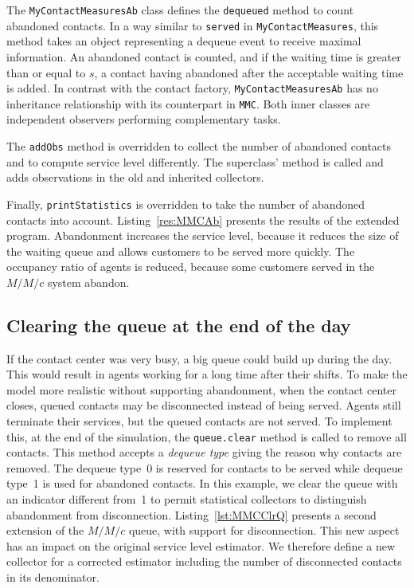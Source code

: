 

The
\texttt{My\-Contact\-Measures\-Ab} class defines the \texttt{dequeued}
method to count abandoned contacts.  In a way similar to
\texttt{served} in \texttt{My\-Contact\-Measures}, this method takes
an object representing a
dequeue event to receive maximal
information.  An abandoned contact is counted, and if the waiting time is
greater than or equal to $s$, a contact having abandoned after the
acceptable waiting time is added.  In contrast with the contact
factory,
\texttt{My\-Contact\-Measures\-Ab} has no inheritance relationship
with its counterpart in \texttt{MMC}.  Both inner classes are
independent observers performing complementary tasks.

The \texttt{addObs} method is overridden to collect the number of
abandoned contacts and to compute service level differently.
The superclass' method is called and adds observations in the old and
inherited collectors.

Finally,
\texttt{print\-Statistics} is overridden to take the number of
abandoned contacts into account.  Listing~\ref{res:MMCAb} presents the
results of the extended program.
Abandonment increases the service level, because it reduces the size
of the waiting queue and allows customers to be served more quickly.
The occupancy ratio of agents is reduced, because some customers
served in the $M/M/c$ system abandon.


\subsection{Clearing the queue at the end of the day}

If the contact center was very busy, a big queue could build up
during the day.  This would result in agents working for a long time
after their shifts.  To make the model more realistic without
supporting abandonment,
when the contact center closes, queued contacts may be disconnected
instead of being served.
Agents still terminate their services, but the queued contacts are not
served.  To implement this, at the end of the simulation, the
\texttt{queue.clear} method
is called to remove all contacts.  This method accepts a
\emph{dequeue type} giving the reason why contacts are removed.
The dequeue type~0 is reserved for contacts to be served while dequeue
type~1 is used for abandoned contacts.  In this example, we clear the
queue with an indicator different from~1 to permit statistical
collectors to distinguish abandonment from disconnection.
Listing~\ref{lst:MMCClrQ} presents a second extension of the
$M/M/c$ queue, with support for disconnection.  This new aspect has an
impact on the original service level estimator.  We therefore define a
new collector for a corrected estimator including the number of
disconnected contacts in its denominator.

